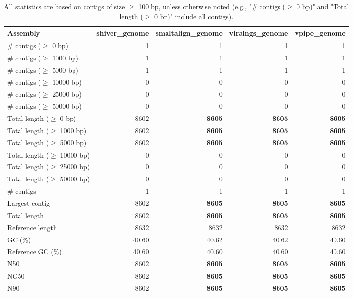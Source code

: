 \documentclass[12pt,a4paper]{article}
\begin{document}
\begin{table}[ht]
\begin{center}
\caption{All statistics are based on contigs of size $\geq$ 100 bp, unless otherwise noted (e.g., "\# contigs ($\geq$ 0 bp)" and "Total length ($\geq$ 0 bp)" include all contigs).}
\begin{tabular}{|l*{4}{|r}|}
\hline
Assembly & shiver\_genome & smaltalign\_genome & viralngs\_genome & vpipe\_genome \\ \hline
\# contigs ($\geq$ 0 bp) & 1 & 1 & 1 & 1 \\ \hline
\# contigs ($\geq$ 1000 bp) & 1 & 1 & 1 & 1 \\ \hline
\# contigs ($\geq$ 5000 bp) & 1 & 1 & 1 & 1 \\ \hline
\# contigs ($\geq$ 10000 bp) & 0 & 0 & 0 & 0 \\ \hline
\# contigs ($\geq$ 25000 bp) & 0 & 0 & 0 & 0 \\ \hline
\# contigs ($\geq$ 50000 bp) & 0 & 0 & 0 & 0 \\ \hline
Total length ($\geq$ 0 bp) & 8602 & {\bf 8605} & {\bf 8605} & {\bf 8605} \\ \hline
Total length ($\geq$ 1000 bp) & 8602 & {\bf 8605} & {\bf 8605} & {\bf 8605} \\ \hline
Total length ($\geq$ 5000 bp) & 8602 & {\bf 8605} & {\bf 8605} & {\bf 8605} \\ \hline
Total length ($\geq$ 10000 bp) & 0 & 0 & 0 & 0 \\ \hline
Total length ($\geq$ 25000 bp) & 0 & 0 & 0 & 0 \\ \hline
Total length ($\geq$ 50000 bp) & 0 & 0 & 0 & 0 \\ \hline
\# contigs & 1 & 1 & 1 & 1 \\ \hline
Largest contig & 8602 & {\bf 8605} & {\bf 8605} & {\bf 8605} \\ \hline
Total length & 8602 & {\bf 8605} & {\bf 8605} & {\bf 8605} \\ \hline
Reference length & 8632 & 8632 & 8632 & 8632 \\ \hline
GC (\%) & 40.60 & 40.62 & 40.62 & 40.60 \\ \hline
Reference GC (\%) & 40.60 & 40.60 & 40.60 & 40.60 \\ \hline
N50 & 8602 & {\bf 8605} & {\bf 8605} & {\bf 8605} \\ \hline
NG50 & 8602 & {\bf 8605} & {\bf 8605} & {\bf 8605} \\ \hline
N90 & 8602 & {\bf 8605} & {\bf 8605} & {\bf 8605} \\ \hline

\end{tabular}
\end{center}
\end{table}
\end{document}
